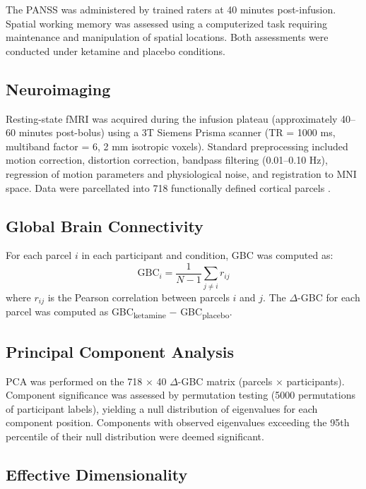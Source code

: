 \documentclass[11pt]{article}
\begin{document}
The PANSS \citep{kay1987} was administered by trained raters at 40 minutes post-infusion. Spatial working memory was assessed using a computerized task requiring maintenance and manipulation of spatial locations. Both assessments were conducted under ketamine and placebo conditions.

\subsection{Neuroimaging}

Resting-state fMRI was acquired during the infusion plateau (approximately 40--60 minutes post-bolus) using a 3T Siemens Prisma scanner (TR = 1000 ms, multiband factor = 6, 2 mm isotropic voxels). Standard preprocessing included motion correction, distortion correction, bandpass filtering (0.01--0.10 Hz), regression of motion parameters and physiological noise, and registration to MNI space. Data were parcellated into 718 functionally defined cortical parcels \citep{glasser2016}.

\subsection{Global Brain Connectivity}

For each parcel $i$ in each participant and condition, GBC was computed as:
\begin{equation}
\text{GBC}_i = \frac{1}{N-1} \sum_{j \neq i} r_{ij}
\end{equation}
where $r_{ij}$ is the Pearson correlation between parcels $i$ and $j$. The $\Delta$-GBC for each parcel was computed as GBC\textsubscript{ketamine} $-$ GBC\textsubscript{placebo}.

\subsection{Principal Component Analysis}

PCA was performed on the 718 $\times$ 40 $\Delta$-GBC matrix (parcels $\times$ participants). Component significance was assessed by permutation testing (5000 permutations of participant labels), yielding a null distribution of eigenvalues for each component position. Components with observed eigenvalues exceeding the 95th percentile of their null distribution were deemed significant.

\subsection{Effective Dimensionality}
\end{document}
